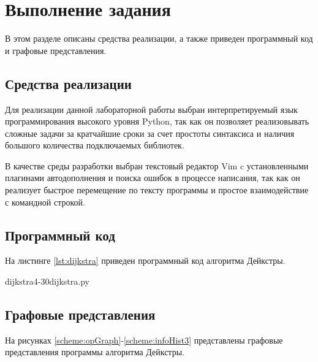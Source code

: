 \chapter{Выполнение задания}

В этом разделе описаны средства реализации, а также приведен программный код и
графовые представления.

\section{Средства реализации}

Для реализации данной лабораторной работы выбран интерпретируемый язык
программирования высокого уровня Python\cite{python}, так как он позволяет
реализовывать сложные задачи за кратчайшие сроки за счет простоты синтаксиса и
наличия большого количества подключаемых библиотек. 

В качестве среды разработки выбран текстовый редактор Vim\cite{vim} c
установленными плагинами автодополнения и поиска ошибок в процессе написания,
так как он реализует быстрое перемещение по тексту программы и простое
взаимодействие с командной строкой.

\clearpage
\section{Программный код}

На листинге \ref{lst:dijkstra} приведен программный код алгоритма Дейкстры.

          {dijkstra}{4-30}{dijkstra.py}

\clearpage
\section{Графовые представления}

На рисунках \ref{scheme:opGraph}-\ref{scheme:infoHist3} представлены
графовые представления программы алгоритма Дейкстры.

\noindent
{}
\noindent
{}
\noindent
{}
\noindent
{}
\noindent
{}
\noindent
{}
